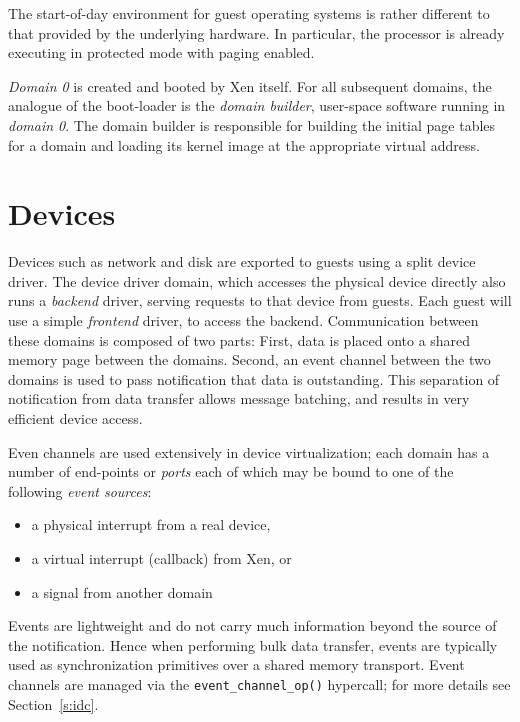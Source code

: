 \documentclass[11pt,twoside,final,openright]{xenstyle}
\begin{document}
The start-of-day environment for guest operating systems is rather
different to that provided by the underlying hardware. In particular,
the processor is already executing in protected mode with paging
enabled.

{\it Domain 0} is created and booted by Xen itself. For all subsequent
domains, the analogue of the boot-loader is the {\it domain builder},
user-space software running in {\it domain 0}. The domain builder 
is responsible for building the initial page tables for a domain  
and loading its kernel image at the appropriate virtual address. 



\chapter{Devices}
\label{c:devices}

Devices such as network and disk are exported to guests using a
split device driver.  The device driver domain, which accesses the
physical device directly also runs a {\em backend} driver, serving
requests to that device from guests.  Each guest will use a simple
{\em frontend} driver, to access the backend.  Communication between these
domains is composed of two parts:  First, data is placed onto a shared
memory page between the domains.  Second, an event channel between the
two domains is used to pass notification that data is outstanding.
This separation of notification from data transfer allows message
batching, and results in very efficient device access.  

Even channels are used extensively in device virtualization; each
domain has a number of end-points or \emph{ports} each of which
may be bound to one of the following \emph{event sources}:
\begin{itemize} 
  \item a physical interrupt from a real device, 
  \item a virtual interrupt (callback) from Xen, or 
  \item a signal from another domain 
\end{itemize}

Events are lightweight and do not carry much information beyond 
the source of the notification. Hence when performing bulk data
transfer, events are typically used as synchronization primitives
over a shared memory transport. Event channels are managed via 
the {\tt event\_channel\_op()} hypercall; for more details see
Section~\ref{s:idc}. 
\end{document}
